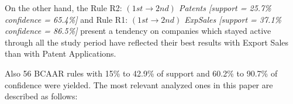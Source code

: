 \documentclass[a4paper,twoside]{article}
\begin{document}
On the other hand, the Rule R2: \textit{$( 1st \to 2nd )$ Patents [support = 25.7\% confidence = 65.4\%]} and Rule R1: \textit{$( 1st \to 2nd )$ ExpSales [support = 37.1\% confidence = 86.5\%]} present a tendency on companies which stayed active through all the study period have reflected their best results with Export Sales than with Patent Applications.

Also 56 BCAAR rules with 15\% to 42.9\% of support and 60.2\% to 90.7\% of confidence were yielded. The most relevant analyzed ones in this paper are described as follows:
\end{document}
